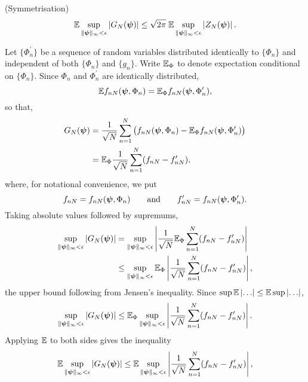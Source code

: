 \documentclass[journal]{IEEEtran}
\begin{document}
\begin{lemma} \label{lem:symmetrisation}(Symmetrisation)
\[
{\mathbb E} \sup_{\|\boldsymbol{\psi}\|_{\infty} < \epsilon} \left\vert  G_N(\boldsymbol{\psi}) \right\vert \leq \sqrt{2\pi} \; {\mathbb E} \sup_{\|\boldsymbol{\psi}\|_{\infty} < \epsilon}  \left\vert  Z_N(\boldsymbol{\psi})  \right\vert.
\]
\end{lemma}
\begin{IEEEproof}
Let $\{\Phi_n^\prime\}$ be a sequence of random variables distributed identically to $\{\Phi_n\}$ and independent of both $\{\Phi_n\}$ and $\{g_n\}$.  Write ${\mathbb E}_\Phi$ to denote expectation conditional on $\{\Phi_n\}$.  %
Since $\Phi_n$ and $\Phi_n^\prime$ are identically distributed,
\[
{\mathbb E} f_{nN}(\boldsymbol{\psi}, \Phi_n) = {\mathbb E}_\Phi f_{nN}(\boldsymbol{\psi}, \Phi_n^\prime),
\]
so that,
\begin{align*}
G_N(\boldsymbol{\psi}) &= \frac{1}{\sqrt{N}} \sum_{n=1}^{N} \big( f_{nN}(\boldsymbol{\psi}, \Phi_n) - {\mathbb E}_\Phi f_{nN}(\boldsymbol{\psi}, \Phi_n^\prime) \big)  \\
&= {\mathbb E}_\Phi \frac{1}{\sqrt{N}} \sum_{n=1}^{N} ( f_{nN} - f_{nN}^\prime ),
\end{align*}
where, for notational convenience, we put 
\[
f_{nN} = f_{nN}(\boldsymbol{\psi}, \Phi_n) \qquad \text{and} \qquad  f_{nN}^\prime = f_{nN}(\boldsymbol{\psi}, \Phi_n^\prime).
\] 
Taking absolute values followed by supremums,
\begin{align*}
 \sup_{\|\boldsymbol{\psi}\|_{\infty} < \epsilon} \left\vert  G_N(\boldsymbol{\psi}) \right\vert &= \sup_{\|\boldsymbol{\psi}\|_{\infty} < \epsilon}  \left\vert \frac{1}{\sqrt{N}} {\mathbb E}_\Phi \sum_{n=1}^{N} (f_{nN} - f_{nN}^\prime ) \right\vert \\
&\leq \sup_{\|\boldsymbol{\psi}\|_{\infty} < \epsilon} {\mathbb E}_\Phi  \left\vert  \frac{1}{\sqrt{N}} \sum_{n=1}^{N}  (f_{nN} - f_{nN}^\prime)  \right\vert,
\end{align*}
the upper bound following from Jensen's inequality.  Since $\sup \expect \abs{\dots} \leq \expect \sup \abs{\dots}$, %
\begin{equation}\label{eq:Eoutsidesup}
 \sup_{\|\psibf\|_{\infty} < \epsilon} \abs{ G_N(\psibf)} \leq \expect_\Phi \sup_{\|\psibf\|_{\infty} < \epsilon} \abs{ \frac{1}{\sqrt{N}}\sum_{n=1}^{N} ( f_{nN} - f_{nN}^\prime ) }.
\end{equation}
Applying ${\mathbb E}$ to both sides gives the inequality
\begin{equation}\label{eq:Gninequfin}
 \expect \sup_{\|\psibf\|_{\infty} < \epsilon} \abs{ G_N(\psibf)} \leq  \expect \sup_{\|\psibf\|_{\infty} < \epsilon} \abs{ \frac{1}{\sqrt{N}}\sum_{n=1}^{N}  (f_{nN} - f_{nN}^\prime) },

\end{equation}
\end{IEEEproof}
\end{document}

